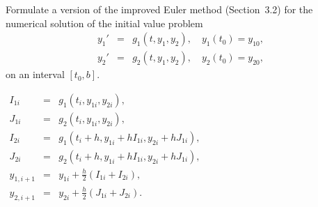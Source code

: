 \documentclass{ximera}
\begin{document}
\begin{problem}\label{exer:10.1.8}
Formulate a version of the improved Euler method
(Section~3.2)
for the numerical solution of the initial value problem
$$
\begin{array}{rcl}
y_1'&=&g_1(t,y_1,y_2),\quad y_1(t_0)=y_{10},\\
y_2'&=&g_2(t,y_1,y_2),\quad y_2(t_0)=y_{20},
\end{array}
$$
on an interval $[t_0,b]$.

\begin{solution}

    $\begin{array}{rcl}
I_{1i}&=&g_1(t_i,y_{1i},y_{2i}),\\
J_{1i}&=&g_2(t_i,y_{1i},y_{2i}),\\
I_{2i}&=&g_1\left(t_i+h,y_{1i}+hI_{1i},y_{2i}+hJ_{1i}\right),\\
J_{2i}&=&g_2\left(t_i+h,y_{1i}+hI_{1i},y_{2i}+hJ_{1i}\right),\\
y_{1,i+1}&=&y_{1i}+\frac{h}{2}(I_{1i}+I_{2i}),\\
y_{2,i+1}&=&y_{2i}+\frac{h}{2}(J_{1i}+J_{2i}).
\end{array}$
\end{solution}
\end{problem}
\end{document}
